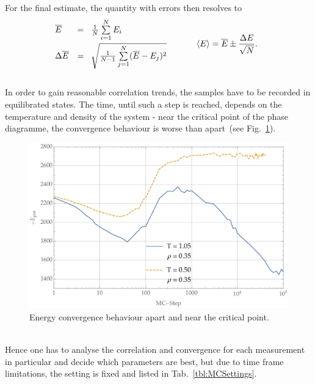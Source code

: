 For the final estimate, the quantity with errors then resolves to
\begin{align}
	\begin{split}
	  \begin{array}{l l}
	  \overline{E}&=\hspace{0.2cm}\frac{1}{N}\sum\limits_{i=1}^N E_i\smallskip\\
	  	\Delta \overline{E}&=\hspace{0.2cm}\sqrt{\frac{1}{N-1}\sum\limits_{j=1}^{N}(\overline{E}-E_j)^2}
	  \end{array}
	  \hspace{1cm}\Braket{E} &=\overline{E} \pm \frac{\Delta E}{\sqrt N}.
	\end{split}
\end{align}
\medskip\\
In order to gain reasonable correlation trends, the samples have to be re\-corded in equilibrated states.
The time, until such a step is reached, depends on the temperature and density of the system - near the critical point of the phase diagramme, the convergence behaviour is worse than apart~(see Fig.~\ref{fig:MCEnergyConvergence}).
\begin{figure}[ht]
	\includegraphics[width=\textwidth]{Figures/MCEnergyConvergence.pdf}
	\caption[MC: Energy Convergence Behaviour]{Energy convergence behaviour apart and near the critical point.}
	\label{fig:MCEnergyConvergence}
\end{figure}\\
Hence one has to analyse the correlation and convergence for each measurement in particular and decide which parameters are best, but due to time frame limitations, the setting is fixed and listed in Tab.~\ref{tbl:MCSettings}.

